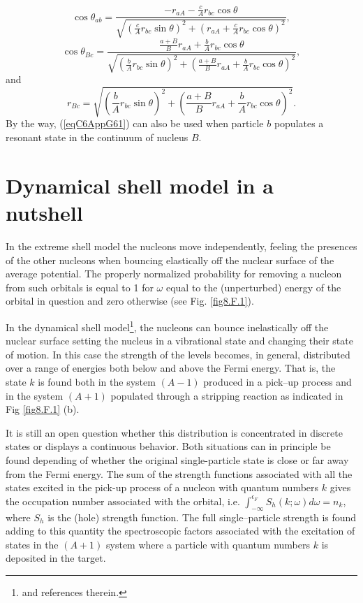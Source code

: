 \begin{equation}\label{eqC6AppG63}
\cos \theta_{ab}=\frac{-r_{aA}-\frac{c}{A}r_{bc}\cos \theta}{\sqrt{\left(\frac{c}{A}r_{bc}\sin \theta\right)^2+\left(r_{aA}+\frac{c}{A}r_{bc}\cos \theta\right)^2}},
\end{equation}
\begin{equation}\label{eqC6AppG64}
\cos \theta_{Bc}=\frac{\frac{a+B}{B}r_{aA}+\frac{b}{A}r_{bc}\cos \theta}{\sqrt{\left(\frac{b}{A}r_{bc}\sin \theta\right)^2+\left(\frac{a+B}{B}r_{aA}+\frac{b}{A}r_{bc}\cos \theta\right)^2}},
\end{equation}
and
\begin{equation}\label{eqC6AppG65}
r_{Bc}=\sqrt{\left(\frac{b}{A}r_{bc}\sin \theta\right)^2+\left(\frac{a+B}{B}r_{aA}+\frac{b}{A}r_{bc}\cos \theta\right)^2}.
\end{equation}
By the way, (\ref{eqC6AppG61}) can also be used when particle $b$ populates a resonant state in the continuum of nucleus $B$.  

\section{Dynamical shell model in a nutshell}\label{C6AppI}
In the extreme shell model the nucleons move independently, feeling the presences of the other nucleons when bouncing elastically off the nuclear surface of the average potential. The properly normalized probability for removing a nucleon from such orbitals is equal to 1 for $\omega$ equal to the (unperturbed) energy of the orbital in question and zero otherwise (see Fig. \ref{fig8.F.1}).

In the dynamical shell model\footnote{\cite{Mahaux:85} and references therein.}, the nucleons can bounce inelastically off the nuclear surface setting the nucleus in a vibrational state and changing their state of motion. In this case the strength of the levels becomes, in general, distributed over a range of energies both below and above the Fermi energy. That is, the state $k$ is found both in the system $(A-1)$ produced in a pick--up process and in the system $(A+1)$ populated through a stripping reaction as indicated in Fig \ref{fig8.F.1} (b).



It is still an open question whether this distribution is concentrated in discrete states or displays a continuous behavior. Both situations can in principle be found depending of whether the original single-particle state is close or far away from the Fermi energy. The sum of the strength functions associated with all the states excited in the pick-up process of a nucleon with quantum numbers $k$ gives the occupation number associated with the orbital, i.e. $\int_{-\infty}^{\epsilon_F}S_{h}(k;\omega)d\omega=n_k$, where $S_h$ is the (hole) strength function. The full single--particle strength is found adding to this quantity the spectroscopic factors associated with the excitation of states in the $(A+1)$ system where a particle with quantum numbers $k$ is deposited in the target.



